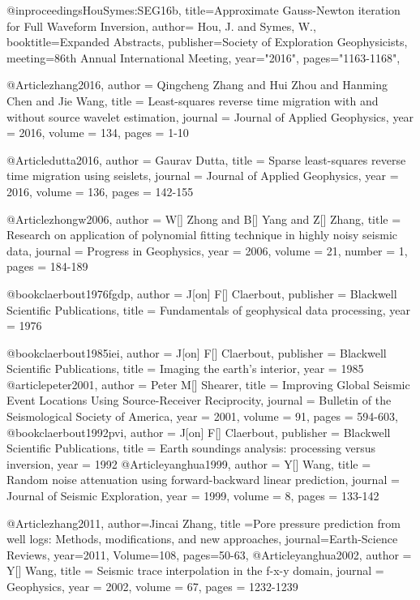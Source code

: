 @inproceedings{HouSymes:SEG16b,
title={Approximate Gauss-Newton iteration for Full Waveform Inversion},
author= {Hou, J. and Symes, W.},
booktitle={Expanded Abstracts},
publisher={Society of Exploration Geophysicists},
meeting={86th Annual International Meeting},
year="2016",
pages="1163-1168",
}

@Article{zhang2016,
  author = 	 {Qingcheng Zhang and Hui Zhou and Hanming Chen and Jie Wang},
  title = 	 {Least-squares reverse time migration with and without source wavelet estimation},
  journal = 	 {Journal of Applied Geophysics},
  year = 	 2016,
  volume = 	 134,
  pages = 	 {1-10}}
  

@Article{dutta2016,
  author = 	 {Gaurav Dutta},
  title = 	 {Sparse least-squares reverse time migration using seislets},
  journal = 	 {Journal of Applied Geophysics},
  year = 	 2016,
  volume = 	 136,
  pages = 	 {142-155}}

@Article{zhongw2006,
  author = 	 {W[] Zhong and B[] Yang and Z[] Zhang},
  title = 	 {Research on application of polynomial fitting technique in highly noisy seismic data},
  journal = 	 {Progress in Geophysics},
  year = 	 2006,
  volume = 	 21,
  number = 	 1,
  pages = 	 {184-189}}

@book{claerbout1976fgdp,
   author = {J[on] F[] Claerbout},
   publisher = {Blackwell Scientific Publications},
   title = {Fundamentals of geophysical data processing},
   year = {1976}
}

@book{claerbout1985iei,
   author = {J[on] F[] Claerbout},
   publisher = {Blackwell Scientific Publications},
   title = {Imaging the earth's interior},
   year = {1985}
}
@article{peter2001,
  author =	 {Peter M[] Shearer},
  title =	 {Improving Global Seismic Event Locations Using Source-Receiver Reciprocity},
  journal = 	 {Bulletin of the Seismological Society of America},
  year = 	 2001,
  volume =	 91,
  pages =	 {594-603},
}
@book{claerbout1992pvi,
   author = {J[on] F[] Claerbout},
   publisher = {Blackwell Scientific Publications},
   title = {Earth soundings analysis: processing versus inversion},
   year = {1992}
}
@Article{yanghua1999,
  author = 	 {Y[] Wang},
  title = 	 {Random noise attenuation using forward-backward linear prediction},
  journal = 	 {Journal of Seismic Exploration},
  year = 	 1999,
  volume =	 8,
  pages =	 {133-142}
}

@Article{zhang2011,
  author={Jincai Zhang},
  title ={Pore pressure prediction from well logs: Methods, modifications, and new approaches},
  journal={Earth-Science Reviews},
  year=2011,
  Volume=108,
  pages={50-63},
}
@Article{yanghua2002,
  author = 	 {Y[] Wang},
  title = 	 {Seismic trace interpolation in the f-x-y domain},
  journal = 	 {Geophysics},
  year = 	 2002,
  volume =	 67,
  pages =	 {1232-1239}
}

